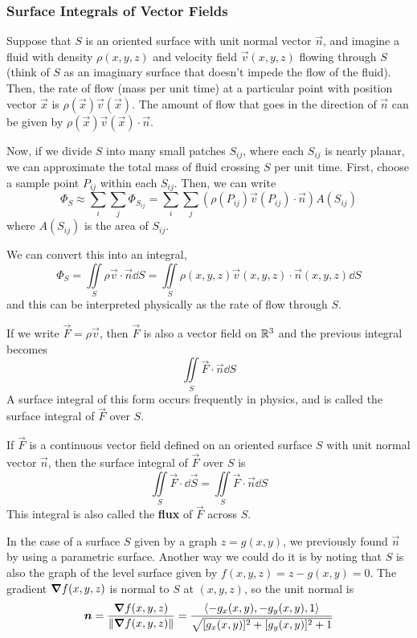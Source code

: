 \subsubsection{Surface Integrals of Vector Fields}
Suppose that $S$ is an oriented surface with unit normal vector $\vec n$, and imagine a fluid with density $\rho(x,y,z)$ and velocity field $\vec v(x,y,z)$ flowing through $S$ (think of $S$ as an imaginary surface that doesn't impede the flow of the fluid). Then, the rate of flow (mass per unit time) at a particular point with position vector $\vec x$ is $\rho(\vec x)\vec v(\vec x)$. The amount of flow that goes in the direction of $\vec n$ can be given by $\rho(\vec x)\vec v(\vec x) \cdot \vec n$. \par Now, if we divide $S$ into many small patches $S_{ij}$, where each $S_{ij}$ is nearly planar, we can approximate the total mass of fluid crossing $S$ per unit time. First, choose a sample point $P_{ij}$ within each $S_{ij}$. Then, we can write
\[ \Phi_S \approx \sum_{i}\sum_j \Phi_{S_{ij}} =  \sum_i\sum_j (\rho(P_{ij}) \vec v(P_{ij}) \cdot \vec n)A(S_{ij})\]
where $A(S_{ij})$ is the area of $S_{ij}$. \par
We can convert this into an integral,
\[ \Phi_S = \iint\limits_S \rho \vec v \cdot \vec n \dd S = \iint\limits_S \rho(x,y,z)\vec v(x,y,z) \cdot \vec n(x,y,z)\dd S\]
and this can be interpreted physically as the rate of flow through $S$. \par
If we write $\vec F = \rho \vec v$, then $\vec F$ is also a vector field on $\mathbb{R}^3$ and the previous integral becomes
\[ \iint\limits_S \vec F \cdot \vec n \dd S \]
A surface integral of this form occurs frequently in physics, and is called the surface integral of $\vec F$ over $S$.
\begin{definition}
    If $\vec F$ is a continuous vector field defined on an oriented surface $S$ with unit normal vector $\vec n$, then the surface integral of $\vec F$ over $S$ is
    \[ \iint\limits_S \vec F \cdot \dd \vec S = \iint\limits_S \vec F \cdot \vec n \dd S\]
    This integral is also called the \textbf{flux} of $\vec F$ across $S$.
\end{definition}
In the case of a surface $S$ given by a graph $z=g(x,y)$, we previously found $\vec n$ by using a parametric surface. Another way we could do it is by noting that $S$ is also the graph of the level surface given by $f(x,y,z) = z - g(x,y) = 0$. The gradient $\grad f(x,y,z)$ is normal to $S$ at $(x,y,z)$, so the unit normal is
\[ \boldsymbol{n} = \frac{\grad f(x,y,z)}{\norm{\grad f(x,y,z)}} = \frac{\left\langle -g_x(x,y), -g_y(x,y), 1\right\rangle}{\sqrt{[g_x(x,y)]^2+[g_y(x,y)]^2+1}}\]
